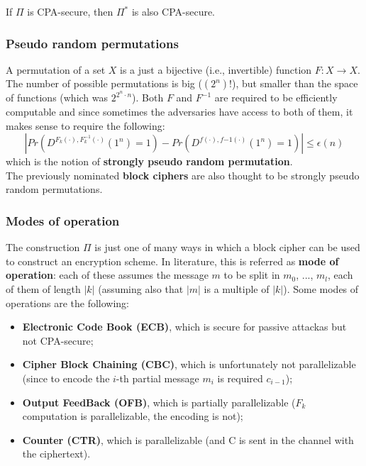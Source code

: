 \documentclass[../main]{subfiles}
\begin{document}
\begin{theorem}
    If $\Pi$ is CPA-secure, then $\Pi^*$ is also CPA-secure.
\end{theorem}

\subsubsection{Pseudo random permutations}
A permutation of a set $X$ is a just a bijective (i.e., invertible) function $F: X \rightarrow{} X$.
The number of possible permutations is big ($(2^n)!$), but smaller than the space of functions (which was $2^{2^n \cdot{} n}$).
Both $F$ and $F^{-1}$ are required to be efficiently computable and since sometimes the adversaries have access to both of them, it makes sense to require the following:
$$|Pr(D^{F_k(\cdot),F^{-1}_k(\cdot)}(1^n)=1)-Pr(D^{f(\cdot),f{-1}(\cdot)}(1^n)=1)| \le{} \epsilon(n)$$
which is the notion of \textbf{strongly pseudo random permutation}.\\
\noindent
The previously nominated \textbf{block ciphers} are also thought to be strongly pseudo random permutations.

\subsubsection{Modes of operation}
The construction $\Pi$ is just one of many ways in which a block cipher can be used to construct an encryption scheme.
In literature, this is referred as \textbf{mode of operation}: each of these assumes the message $m$ to be split in $m_0$, ..., $m_l$, each of them of length $|k|$ (assuming also that $|m|$ is a multiple of $|k|$).
Some modes of operations are the following:
\begin{itemize}
    \item \textbf{Electronic Code Book (ECB)}, which is secure for passive attackas but not CPA-secure;
    \item \textbf{Cipher Block Chaining (CBC)}, which is unfortunately not parallelizable (since to encode the $i$-th partial message $m_i$ is required $c_{i-1}$);
    \item \textbf{Output FeedBack (OFB)}, which is partially parallelizable ($F_k$ computation is parallelizable, the encoding is not);
    \item \textbf{Counter (CTR)}, which is parallelizable (and C is sent in the channel with the ciphertext).
\end{itemize}
\end{document}
